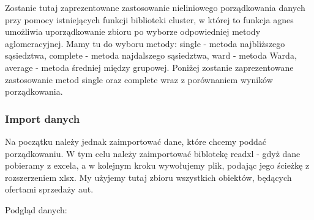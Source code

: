 \documentclass[12pt,a4paper]{report}
\begin{document}
{%


Zostanie tutaj zaprezentowane zastosowanie nieliniowego porządkowania
danych przy pomocy istniejących funkcji biblioteki cluster, w której to
funkcja agnes umożliwia uporządkowanie zbioru po wyborze
odpowiedniej metody aglomeracyjnej. Mamy tu do wyboru metody: single -
metoda najbliższego sąsiedztwa, complete - metoda najdalszego
sąsiedztwa, ward - metoda Warda, average - metoda średniej między
grupowej. Poniżej zostanie zaprezentowane zastosowanie metod single oraz
complete wraz z porównaniem wyników porządkowania.

\subsubsection{Import danych}\label{import-danych}

Na początku należy jednak zaimportować dane, które chcemy poddać porządkowaniu.
W tym celu należy zaimportować biblotekę readxl - gdyż dane pobieramy z
excela, a w kolejnym kroku wywołujemy plik, podając jego ścieżkę 
z rozszerzeniem xlsx. My użyjemy tutaj zbioru wszystkich obiektów,
będących ofertami sprzedaży aut.

\begin{Shaded}
\begin{Highlighting}[]
\StringTok{ }\NormalTok{(}\NormalTok{, }
                            \NormalTok{)}
\end{Highlighting}
\end{Shaded}

Podgląd danych:

\begin{Shaded}
\begin{Highlighting}[]
\end{Highlighting}
\end{Shaded}

}
\end{document}
